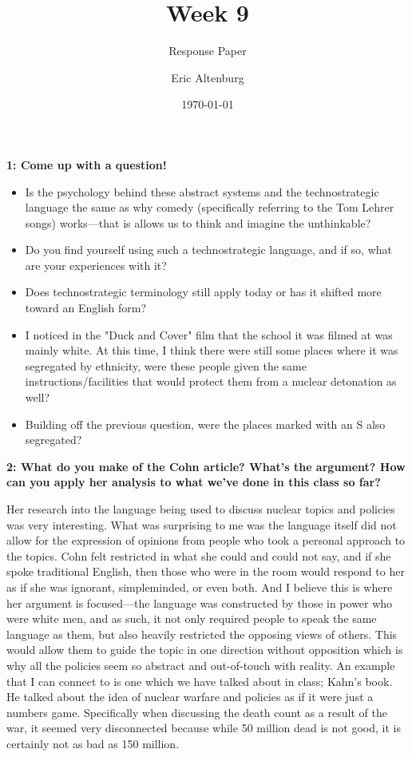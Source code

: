 \documentclass[12pt]{turabian-researchpaper}
\title{Week 9}
\subtitle{Response Paper}
\author{Eric Altenburg}
\date{\today}
\newcommand\question[2]{\noindent\textbf{#1: #2}}
\begin{document}
\maketitle

\question{1}{Come up with a question!}

	\begin{itemize}
		\item Is the psychology behind these abstract systems and the technostrategic language the same as why comedy (specifically referring to the Tom Lehrer songs) works—that is allows us to think and imagine the unthinkable?
		\item Do you find yourself using such a technostrategic language, and if so, what are your experiences with it?
		\item Does technostrategic terminology still apply today or has it shifted more toward an English form?
		\item I noticed in the "Duck and Cover" film that the school it was filmed at was mainly white. At this time, I think there were still some places where it was segregated by ethnicity, were these people given the same instructions/facilities that would protect them from a nuclear detonation as well? 
		\item Building off the previous question, were the places marked with an S also segregated?
	\end{itemize}

\question{2}{What do you make of the Cohn article? What's the argument? How can you apply her analysis to what we've done in this class so far?}
	
	Her research into the language being used to discuss nuclear topics and policies was very interesting. What was surprising to me was the language itself did not allow for the expression of opinions from people who took a personal approach to the topics. Cohn felt restricted in what she could and could not say, and if she spoke traditional English, then those who were in the room would respond to her as if she was ignorant, simpleminded, or even both. And I believe this is where her argument is focused—the language was constructed by those in power who were white men, and as such, it not only required people to speak the same language as them, but also heavily restricted the opposing views of others. This would allow them to guide the topic in one direction without opposition which is why all the policies seem so abstract and out-of-touch with reality. An example that I can connect to is one which we have talked about in class; Kahn's book. He talked about the idea of nuclear warfare and policies as if it were just a numbers game. Specifically when discussing the death count as a result of the war, it seemed very disconnected because while 50 million dead is not good, it is certainly not as bad as 150 million. 
\end{document}
